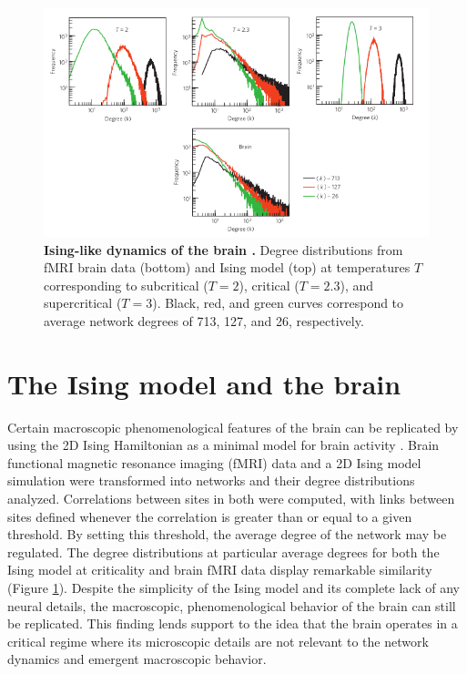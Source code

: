 \documentclass[12pt]{article}
\begin{document}
\begin{figure}      
  \begin{center}    
 \includegraphics[width=.8\textwidth]{isinglikedynamicschialvo}    
    \caption{\textbf{Ising-like dynamics of the brain \cite{Fraiman2009a}.} Degree distributions from fMRI brain data (bottom) and Ising model (top) at temperatures $T$ corresponding to subcritical ($T=2$), critical ($T=2.3$), and supercritical ($T=3$). Black, red, and green curves correspond to average network degrees of 713, 127, and 26, respectively.}
   \label{Figure::Ising model and the brain at criticality}   
  \end{center}     
   \end{figure}
   
\section*{The Ising model and the brain}

Certain macroscopic phenomenological features of the brain can be replicated by using the 2D Ising Hamiltonian as a minimal model for brain activity \cite{Fraiman2009a}. Brain functional magnetic resonance imaging (fMRI) data and a 2D Ising model simulation were transformed into networks and their degree distributions analyzed. Correlations between sites in both were computed, with links between sites defined whenever the correlation is greater than or equal to a given threshold. By setting this threshold, the average degree of the network may be regulated. The degree distributions at particular average degrees for both the Ising model at criticality and brain fMRI data display remarkable similarity (Figure \ref{Figure::Ising model and the brain at criticality}). Despite the simplicity of the Ising model and its complete lack of any neural details, the macroscopic, phenomenological behavior of the brain can still be replicated. This finding lends support to the idea that the brain operates in a critical regime where its microscopic details are not relevant to the network dynamics and emergent macroscopic behavior.
\end{document}
